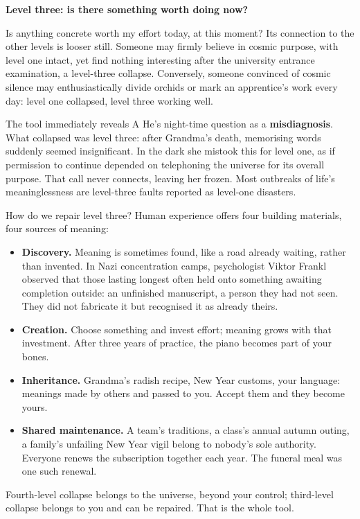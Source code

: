 \textbf{Level three: is there something worth doing now?}

Is anything concrete worth my effort today, at this moment? Its connection to the other levels is looser still. Someone may firmly believe in cosmic purpose, with level one intact, yet find nothing interesting after the university entrance examination, a level-three collapse. Conversely, someone convinced of cosmic silence may enthusiastically divide orchids or mark an apprentice's work every day: level one collapsed, level three working well.

The tool immediately reveals A He's night-time question as a \textbf{misdiagnosis}. What collapsed was level three: after Grandma's death, memorising words suddenly seemed insignificant. In the dark she mistook this for level one, as if permission to continue depended on telephoning the universe for its overall purpose. That call never connects, leaving her frozen. Most outbreaks of life's meaninglessness are level-three faults reported as level-one disasters.

How do we repair level three? Human experience offers four building materials, four sources of meaning:

\begin{itemize}
\item \textbf{Discovery.} Meaning is sometimes found, like a road already waiting, rather than invented. In Nazi concentration camps, psychologist Viktor Frankl observed that those lasting longest often held onto something awaiting completion outside: an unfinished manuscript, a person they had not seen. They did not fabricate it but recognised it as already theirs.
\item \textbf{Creation.} Choose something and invest effort; meaning grows with that investment. After three years of practice, the piano becomes part of your bones.
\item \textbf{Inheritance.} Grandma's radish recipe, New Year customs, your language: meanings made by others and passed to you. Accept them and they become yours.
\item \textbf{Shared maintenance.} A team's traditions, a class's annual autumn outing, a family's unfailing New Year vigil belong to nobody's sole authority. Everyone renews the subscription together each year. The funeral meal was one such renewal.
\end{itemize}
Fourth-level collapse belongs to the universe, beyond your control; third-level collapse belongs to you and can be repaired. That is the whole tool.

